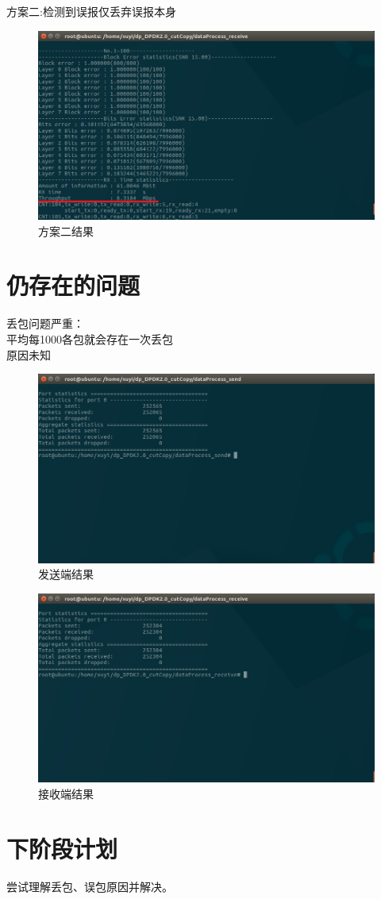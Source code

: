 \documentclass{article}
\begin{document}
\newpage
方案二:检测到误报仅丢弃误报本身\\
\begin{figure}[H]
	\centering
	\includegraphics[width = .8\textwidth]{result_throughput.png}
	\caption{方案二结果}
\end{figure}

\section{仍存在的问题}
丢包问题严重：\\
平均每1000各包就会存在一次丢包\\
原因未知
\begin{figure}[H]
	\centering
	\includegraphics[width = .8\textwidth]{result_drop_send.png}
	\caption{发送端结果}
\end{figure}
\begin{figure}[H]
	\centering
	\includegraphics[width = .8\textwidth]{result_drop_receive.png}
	\caption{接收端结果}
\end{figure}



\section{下阶段计划}
尝试理解丢包、误包原因并解决。
\end{document}
